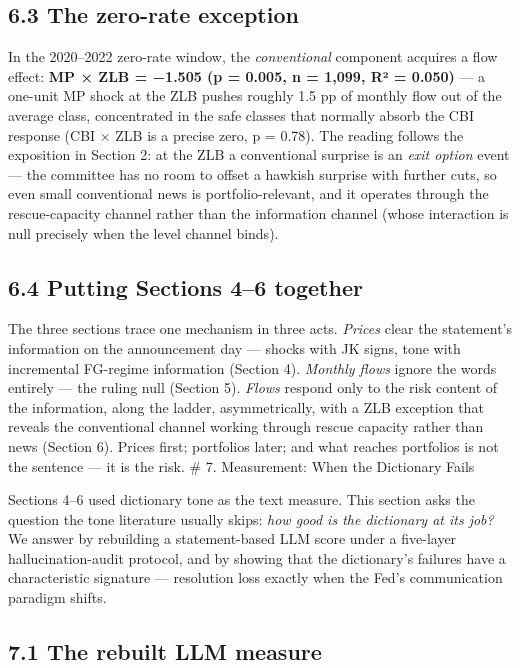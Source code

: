 \subsection{6.3 The zero-rate exception}\label{the-zero-rate-exception}

In the 2020--2022 zero-rate window, the \emph{conventional} component acquires a flow effect: \textbf{MP × ZLB = −1.505 (p = 0.005, n = 1,099, R² = 0.050)} --- a one-unit MP shock at the ZLB pushes roughly 1.5 pp of monthly flow out of the average class, concentrated in the safe classes that normally absorb the CBI response (CBI × ZLB is a precise zero, p = 0.78). The reading follows the exposition in Section 2: at the ZLB a conventional surprise is an \emph{exit option} event --- the committee has no room to offset a hawkish surprise with further cuts, so even small conventional news is portfolio-relevant, and it operates through the rescue-capacity channel rather than the information channel (whose interaction is null precisely when the level channel binds).



\subsection{6.4 Putting Sections 4--6 together}\label{putting-sections-46-together}

The three sections trace one mechanism in three acts. \emph{Prices} clear the statement's information on the announcement day --- shocks with JK signs, tone with incremental FG-regime information (Section 4). \emph{Monthly flows} ignore the words entirely --- the ruling null (Section 5). \emph{Flows} respond only to the risk content of the information, along the ladder, asymmetrically, with a ZLB exception that reveals the conventional channel working through rescue capacity rather than news (Section 6). Prices first; portfolios later; and what reaches portfolios is not the sentence --- it is the risk. \# 7. Measurement: When the Dictionary Fails

Sections 4--6 used dictionary tone as the text measure. This section asks the question the tone literature usually skips: \emph{how good is the dictionary at its job?} We answer by rebuilding a statement-based LLM score under a five-layer hallucination-audit protocol, and by showing that the dictionary's failures have a characteristic signature --- resolution loss exactly when the Fed's communication paradigm shifts.

\subsection{7.1 The rebuilt LLM measure}\label{the-rebuilt-llm-measure}

